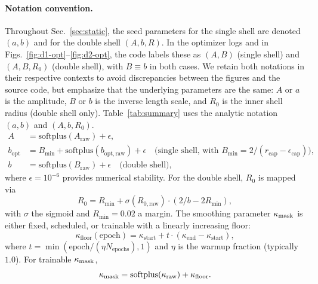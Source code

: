 \documentclass[11pt]{article}
\begin{document}
\paragraph{Notation convention.}
Throughout Sec.~\ref{sec:static}, the seed parameters for the single shell are denoted $(a,b)$ and for the double shell $(A,b,R)$. In the optimizer logs and in Figs.~\ref{fig:d1-opt}--\ref{fig:d2-opt}, the code labels these as $(A,B)$ (single shell) and $(A,B,R_0)$ (double shell), with $B\equiv b$ in both cases. We retain both notations in their respective contexts to avoid discrepancies between the figures and the source code, but emphasize that the underlying parameters are the same: $A$ or $a$ is the amplitude, $B$ or $b$ is the inverse length scale, and $R_0$ is the inner shell radius (double shell only). Table~\ref{tab:summary} uses the analytic notation $(a,b)$ and $(A,b,R_0)$.
\begin{align}
A &= \mathrm{softplus}(A_{\text{raw}}) + \epsilon, \\
b_{\mathrm{opt}} &= B_{\min} + \mathrm{softplus}(b_{\mathrm{opt,raw}}) + \epsilon \quad \text{(single shell, with } B_{\min} = 2 / (r_{\text{cap}} - \epsilon_{\text{cap}})\text{)}, \\
b &= \mathrm{softplus}(B_{\text{raw}}) + \epsilon \quad \text{(double shell)},
\end{align}
where $\epsilon = 10^{-6}$ provides numerical stability. For the double shell, $R_0$ is mapped via
\[
R_0 = R_{\min} + \sigma(R_{0,\text{raw}}) \cdot (2/b - 2R_{\min}),
\]
with $\sigma$ the sigmoid and $R_{\min} = 0.02$ a margin. The smoothing parameter $\kappa_{\rm mask}$ is either fixed, scheduled, or trainable with a linearly increasing floor:
\[
\kappa_{\text{floor}}(\text{epoch}) = \kappa_{\text{start}} + t \cdot (\kappa_{\text{end}} - \kappa_{\text{start}}),
\]
where $t = \min(\text{epoch} / (\eta N_{\text{epochs}}), 1)$ and $\eta$ is the warmup fraction (typically $1.0$). For trainable $\kappa_{\rm mask}$,
\[
\kappa_{\rm mask} = \mathrm{softplus}(\kappa_{\text{raw}}) + \kappa_{\text{floor}}.
\]
\end{document}
